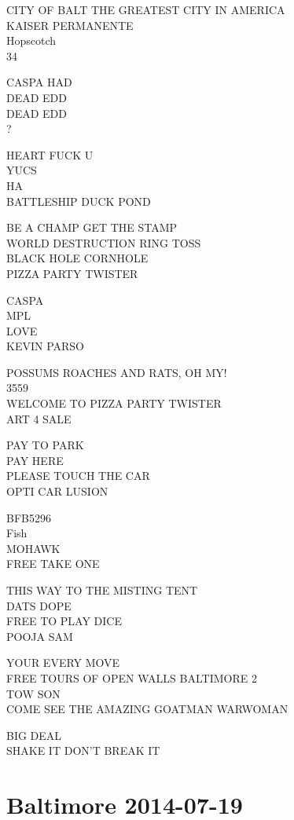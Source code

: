 \documentclass[10pt,letterpaper]{article}
\begin{document}
CITY OF BALT THE GREATEST CITY IN AMERICA\\
KAISER PERMANENTE\\
Hopscotch\\
34

CASPA HAD\\
DEAD EDD\\
DEAD EDD\\
?

HEART FUCK U\\
YUCS\\
HA\\
BATTLESHIP DUCK POND

BE A CHAMP GET THE STAMP\\
WORLD DESTRUCTION RING TOSS\\
BLACK HOLE CORNHOLE\\
PIZZA PARTY TWISTER

CASPA\\
MPL\\
LOVE\\
KEVIN PARSO

POSSUMS ROACHES AND RATS, OH MY!\\
3559\\
WELCOME TO PIZZA PARTY TWISTER\\
ART 4 SALE

PAY TO PARK\\
PAY HERE\\
PLEASE TOUCH THE CAR\\
OPTI CAR LUSION

BFB5296\\
Fish\\
MOHAWK\\
FREE TAKE ONE

THIS WAY TO THE MISTING TENT\\
DATS DOPE\\
FREE TO PLAY DICE\\
POOJA SAM

YOUR EVERY MOVE\\
FREE TOURS OF OPEN WALLS BALTIMORE 2\\
TOW SON\\
COME SEE THE AMAZING GOATMAN WARWOMAN

BIG DEAL\\
SHAKE IT DON'T BREAK IT


\section*{Baltimore 2014-07-19}
\end{document}
